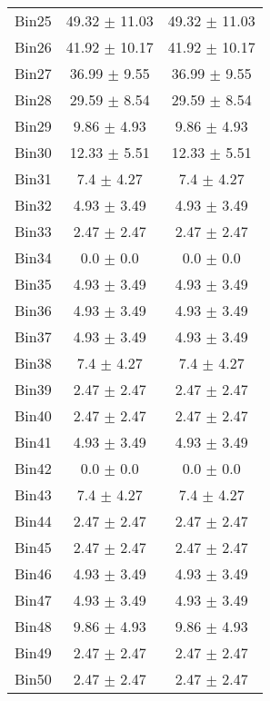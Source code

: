 \begin{tabular}{|c|c|c|}
     Bin25 & 49.32 $\pm$ 11.03 & 49.32 $\pm$ 11.03 \\ \cline{1-3} 
     Bin26 & 41.92 $\pm$ 10.17 & 41.92 $\pm$ 10.17 \\ \cline{1-3} 
     Bin27 & 36.99 $\pm$ 9.55 & 36.99 $\pm$ 9.55 \\ \cline{1-3} 
     Bin28 & 29.59 $\pm$ 8.54 & 29.59 $\pm$ 8.54 \\ \cline{1-3} 
     Bin29 & 9.86 $\pm$ 4.93 & 9.86 $\pm$ 4.93 \\ \cline{1-3} 
     Bin30 & 12.33 $\pm$ 5.51 & 12.33 $\pm$ 5.51 \\ \cline{1-3} 
     Bin31 & 7.4 $\pm$ 4.27 & 7.4 $\pm$ 4.27 \\ \cline{1-3} 
     Bin32 & 4.93 $\pm$ 3.49 & 4.93 $\pm$ 3.49 \\ \cline{1-3} 
     Bin33 & 2.47 $\pm$ 2.47 & 2.47 $\pm$ 2.47 \\ \cline{1-3} 
     Bin34 & 0.0 $\pm$ 0.0 & 0.0 $\pm$ 0.0 \\ \cline{1-3} 
     Bin35 & 4.93 $\pm$ 3.49 & 4.93 $\pm$ 3.49 \\ \cline{1-3} 
     Bin36 & 4.93 $\pm$ 3.49 & 4.93 $\pm$ 3.49 \\ \cline{1-3} 
     Bin37 & 4.93 $\pm$ 3.49 & 4.93 $\pm$ 3.49 \\ \cline{1-3} 
     Bin38 & 7.4 $\pm$ 4.27 & 7.4 $\pm$ 4.27 \\ \cline{1-3} 
     Bin39 & 2.47 $\pm$ 2.47 & 2.47 $\pm$ 2.47 \\ \cline{1-3} 
     Bin40 & 2.47 $\pm$ 2.47 & 2.47 $\pm$ 2.47 \\ \cline{1-3} 
     Bin41 & 4.93 $\pm$ 3.49 & 4.93 $\pm$ 3.49 \\ \cline{1-3} 
     Bin42 & 0.0 $\pm$ 0.0 & 0.0 $\pm$ 0.0 \\ \cline{1-3} 
     Bin43 & 7.4 $\pm$ 4.27 & 7.4 $\pm$ 4.27 \\ \cline{1-3} 
     Bin44 & 2.47 $\pm$ 2.47 & 2.47 $\pm$ 2.47 \\ \cline{1-3} 
     Bin45 & 2.47 $\pm$ 2.47 & 2.47 $\pm$ 2.47 \\ \cline{1-3} 
     Bin46 & 4.93 $\pm$ 3.49 & 4.93 $\pm$ 3.49 \\ \cline{1-3} 
     Bin47 & 4.93 $\pm$ 3.49 & 4.93 $\pm$ 3.49 \\ \cline{1-3} 
     Bin48 & 9.86 $\pm$ 4.93 & 9.86 $\pm$ 4.93 \\ \cline{1-3} 
     Bin49 & 2.47 $\pm$ 2.47 & 2.47 $\pm$ 2.47 \\ \cline{1-3} 
     Bin50 & 2.47 $\pm$ 2.47 & 2.47 $\pm$ 2.47 \\ \cline{1-3} 

\end{tabular}
